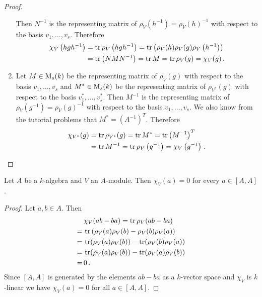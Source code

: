 \begin{proof}
\begin{enumerate}[label=\emph{\alph*)},leftmargin=*]
      Then $N^{-1}$ is the representing matrix of $\rho_V(h^{-1}) = \rho_V(h)^{-1}$ with respect to the basis $v_1, \dotsc, v_s$.
      Therefore
      \begin{align*}
            \chi_V\left( hgh^{-1} \right)
        &=  \operatorname{tr} \rho_V\left( hgh^{-1} \right)
         =  \operatorname{tr}\left( \rho_V(h) \rho_V(g) \rho_V\left( h^{-1} \right) \right) \\
        &=  \operatorname{tr}\left( NMN^{-1} \right)
         =  \operatorname{tr} M
         =  \operatorname{tr} \rho_V(g)
         =  \chi_V(g) \,.
      \end{align*}
    \item
      Let $M \in \operatorname{M}_s(k)$ be the representing matrix of $\rho_V(g)$ with respect to the basis $v_1, \dotsc, v_s$ and $M^* \in \operatorname{M}_s(k)$ be the representing matrix of $\rho_{V^*}(g)$ with respect to the basis $v_1^*, \dotsc, v_s^*$.
      Then $M^{-1}$ is the representing matrix of $\rho_V(g^{-1}) = \rho_V(g)^{-1}$ with respect to the basis $v_1, \dotsc, v_s$.
      We also know from the tutorial problems that $M^* = \left(A^{-1}\right)^T$.
      Therefore
      \begin{align*}
            \chi_{V^*}(g)
        &=  \operatorname{tr} \rho_{V^*}(g)
         =  \operatorname{tr} M^*
         =  \operatorname{tr} \left(M^{-1}\right)^T \\
        &=  \operatorname{tr} M^{-1}
         =  \operatorname{tr} \rho_V\left( g^{-1} \right)
         =  \chi_V\left( g^{-1} \right) \,.
        \qedhere
      \end{align*}
  \end{enumerate}
\end{proof}


\begin{lemma}
  Let $A$ be a $k$-algebra and $V$ an $A$-module.
  Then $\chi_V(a) = 0$ for every $a \in [A,A]$.
\end{lemma}
\begin{proof}
  Let $a, b \in A$.
  Then
  \begin{align*}
     &\,  \chi_V(ab - ba)
    =     \operatorname{tr} \rho_V(ab - ba) \\
    =&\,  \operatorname{tr} \left(
                \rho_V(a) \rho_V(b) - \rho_V(b) \rho_V(a)
              \right) \\
    =&\,  \operatorname{tr}(\rho_V(a)\rho_V(b)) - \operatorname{tr}(\rho_V(b)\rho_V(a)) \\
    =&\,  \operatorname{tr}(\rho_V(a)\rho_V(b)) - \operatorname{tr}(\rho_V(a)\rho_V(b)) \\
    =&\,  0 \,.
  \end{align*}
  Since $[A,A]$ is generated by the elements $ab - ba$ as a $k$-vector space and $\chi_V$ is $k$-linear we have $\chi_V(a) = 0$ for all $a \in [A,A]$.
\end{proof}


